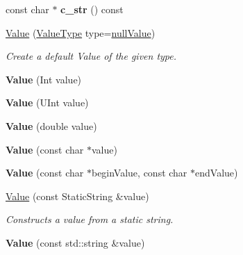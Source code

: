 \begin{DoxyCompactItemize}
\item 
\hypertarget{protocol_json_1_1_j_s_o_n___a_p_i_adc66a5168f8d6578974acfb0d8f5a1e6}{const char $\ast$ {\bfseries c\-\_\-str} () const }\label{protocol_json_1_1_j_s_o_n___a_p_i_adc66a5168f8d6578974acfb0d8f5a1e6}

\item 
\hyperlink{protocol_json_1_1_j_s_o_n___a_p_i_a3a85c4423131080eb9300546d6130dfd}{Value} (\hyperlink{namespace_json_a7d654b75c16a57007925868e38212b4e}{Value\-Type} type=\hyperlink{namespace_json_a7d654b75c16a57007925868e38212b4ea7d9899633b4409bd3fc107e6737f8391}{null\-Value})
\begin{DoxyCompactList}\small\item\em Create a default Value of the given type. \end{DoxyCompactList}\item 
\hypertarget{protocol_json_1_1_j_s_o_n___a_p_i_ae81d6899887463e4fe0bdad8b06e1214}{{\bfseries Value} (Int value)}\label{protocol_json_1_1_j_s_o_n___a_p_i_ae81d6899887463e4fe0bdad8b06e1214}

\item 
\hypertarget{protocol_json_1_1_j_s_o_n___a_p_i_af3c698ea7116db3d779d92ad50feb2ee}{{\bfseries Value} (U\-Int value)}\label{protocol_json_1_1_j_s_o_n___a_p_i_af3c698ea7116db3d779d92ad50feb2ee}

\item 
\hypertarget{protocol_json_1_1_j_s_o_n___a_p_i_abd1299b9965e82812a6494522cc3c804}{{\bfseries Value} (double value)}\label{protocol_json_1_1_j_s_o_n___a_p_i_abd1299b9965e82812a6494522cc3c804}

\item 
\hypertarget{protocol_json_1_1_j_s_o_n___a_p_i_a87d184b04b4759a059f396df660834b9}{{\bfseries Value} (const char $\ast$value)}\label{protocol_json_1_1_j_s_o_n___a_p_i_a87d184b04b4759a059f396df660834b9}

\item 
\hypertarget{protocol_json_1_1_j_s_o_n___a_p_i_ae288a97eaaf54fe2d16f3b73d060d22a}{{\bfseries Value} (const char $\ast$begin\-Value, const char $\ast$end\-Value)}\label{protocol_json_1_1_j_s_o_n___a_p_i_ae288a97eaaf54fe2d16f3b73d060d22a}

\item 
\hyperlink{protocol_json_1_1_j_s_o_n___a_p_i_a5514e83243c886dbb4594877ada2ce05}{Value} (const Static\-String \&value)
\begin{DoxyCompactList}\small\item\em Constructs a value from a static string. \end{DoxyCompactList}\item 
\hypertarget{protocol_json_1_1_j_s_o_n___a_p_i_a58fa65d882bdcdea20e5764f8f0d2292}{{\bfseries Value} (const std\-::string \&value)}\label{protocol_json_1_1_j_s_o_n___a_p_i_a58fa65d882bdcdea20e5764f8f0d2292}


\end{DoxyCompactItemize}
